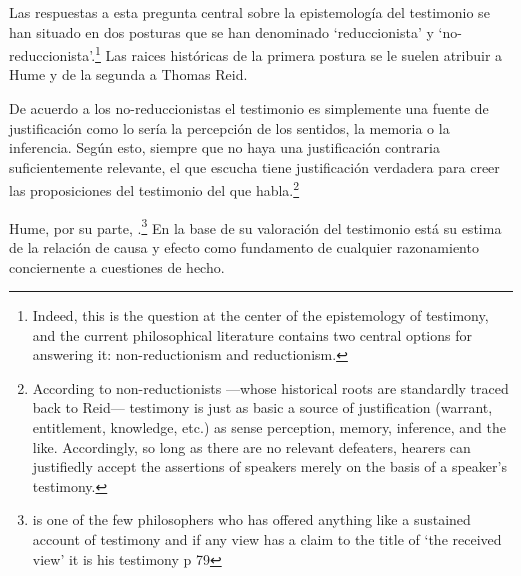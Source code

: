 Las respuestas a esta pregunta central sobre la epistemología del testimonio se
han situado en dos posturas que se han denominado `reduccionista' y
`no-reduccionista'.\footnote{Indeed, this is the question at the center of the
  epistemology of testimony, and the current philosophical literature contains
  two central options for answering it: non-reductionism and reductionism.} Las
raices históricas de la primera postura se le suelen atribuir a Hume y de la
segunda a Thomas Reid.

De acuerdo a los no-reduccionistas el testimonio es simplemente una fuente de
justificación como lo sería la percepción de los sentidos, la memoria o la
inferencia. Según esto, siempre que no haya una justificación contraria
suficientemente relevante, el que escucha tiene justificación verdadera para
creer las proposiciones del testimonio del que habla.\footnote{According to
  non-reductionists ---whose historical roots are standardly traced back to
  Reid--- testimony is just as basic a source of justification (warrant,
  entitlement, knowledge, etc.) as sense perception, memory, inference, and the
  like. Accordingly, so long as there are no relevant defeaters, hearers can
  justifiedly accept the assertions of speakers merely on the basis of a
  speaker's testimony.}

Hume, por su parte, .\footnote{is one of the few philosophers who has offered anything
  like a sustained account of testimony and if any view has a claim to the title
  of `the received view' it is his testimony p 79} En la base de su valoración
del testimonio está su estima de la relación de causa y efecto como fundamento
de cualquier razonamiento conciernente a cuestiones de hecho.

